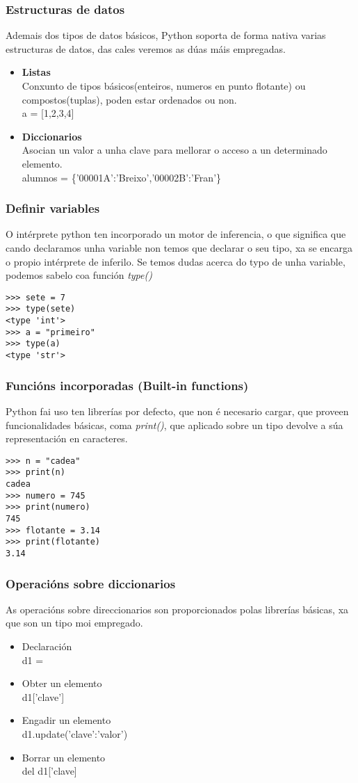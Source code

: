 \begin{frame}
  \frametitle{Estructuras de datos}
  Ademais dos tipos de datos básicos, Python soporta de forma nativa varias
  estructuras de datos, das cales veremos as dúas máis empregadas.
  \begin{itemize}
  \item \textbf{Listas}\\
    Conxunto de tipos básicos(enteiros, numeros en punto flotante) ou
    compostos(tuplas), poden estar ordenados ou non.\\
    a = [1,2,3,4]
  \item \textbf{Diccionarios}\\
    Asocian un valor a unha clave para mellorar o acceso a un determinado
    elemento.\\
    alumnos = \{'00001A':'Breixo','00002B':'Fran'\}
  \end{itemize}
\end{frame}

\begin{frame}[fragile]
  \frametitle{Definir variables}
  O intérprete python ten incorporado un motor de inferencia, o que significa
  que cando declaramos unha variable non temos que declarar o seu tipo, xa se
  encarga o propio intérprete de inferilo. Se temos dudas acerca do typo de unha
  variable, podemos sabelo coa función \emph{type()}
  \small
\begin{verbatim}
>>> sete = 7
>>> type(sete)
<type 'int'>
>>> a = "primeiro"
>>> type(a)
<type 'str'>
\end{verbatim}
  \normalsize  
\end{frame}

\begin{frame}[fragile]
  \frametitle{Funcións incorporadas (Built-in functions)}
  Python fai uso ten librerías por defecto, que non é necesario cargar, que
  proveen funcionalidades básicas, coma \emph{print()}, que aplicado sobre un
  tipo devolve a súa representación en caracteres.
  \small
\begin{verbatim}
>>> n = "cadea"
>>> print(n)
cadea
>>> numero = 745
>>> print(numero)
745
>>> flotante = 3.14
>>> print(flotante)
3.14
\end{verbatim}
  \normalsize   
\end{frame}

\begin{frame}
  \frametitle{Operacións sobre diccionarios}
  As operacións sobre direccionarios son proporcionados polas librerías básicas,
  xa que son un tipo moi empregado.
  \begin{itemize}
  \item Declaración\\
    d1 = {}
  \item Obter un elemento\\
    d1['clave']
  \item Engadir un elemento\\
    d1.update({'clave':'valor'})
  \item Borrar un elemento\\
    del d1['clave]
  \end{itemize}
\end{frame}

